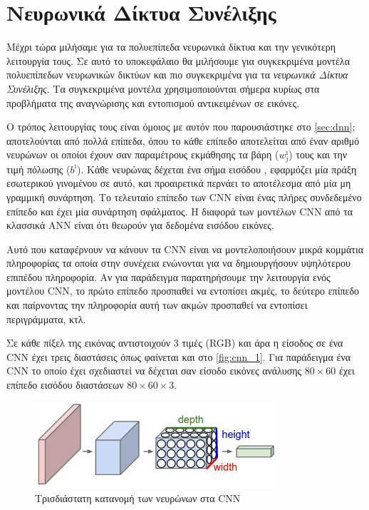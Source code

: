 \section{Νευρωνικά Δίκτυα Συνέλιξης}
\label{sec:theory_cnn}

Μέχρι τώρα μιλήσαμε για τα πολυεπίπεδα νευρωνικά δίκτυα και την γενικότερη
λειτουργία τους. Σε αυτό το υποκεφάλαιο θα μιλήσουμε για συγκεκριμένα μοντέλα
πολυεπίπεδων νευρωνικών δικτύων και πιο συγκεκριμένα για τα
\emph{νευρωνικά Δίκτυα Συνέλιξης}. Τα συγκεκριμένα μοντέλα χρησιμοποιούνται
σήμερα κυρίως στα προβλήματα της αναγνώρισης και εντοπισμού αντικειμένων
σε εικόνες.

Ο τρόπος λειτουργίας τους είναι όμοιος με αυτόν που παρουσιάστηκε στο
\autoref{sec:dnn}; αποτελούνται από πολλά επίπεδα, όπου το κάθε επίπεδο αποτελείται
από έναν αριθμό νευρώνων οι οποίοι έχουν σαν παραμέτρους εκμάθησης τα βάρη ($w_{\jmath}^{\imath}$) τους
και την τιμή πόλωσης ($b^{\imath}$).
Κάθε νευρώνας δέχεται ένα σήμα εισόδου , εφαρμόζει μία πράξη εσωτερικού γινομένου σε αυτό,
και προαιρετικά περνάει το αποτέλεσμα από μία μη γραμμική συνάρτηση.
Το τελευταίο επίπεδο των CNN είναι ένας πλήρες συνδεδεμένο επίπεδο και έχει μία
συνάρτηση σφάλματος.
Η διαφορά των μοντέλων CNN από τα κλασσικά ANN είναι ότι θεωρούν για δεδομένα εισόδου
εικόνες.

Αυτό που καταφέρνουν να κάνουν τα CNN είναι να μοντελοποιήσουν μικρά
κομμάτια πληροφορίας τα οποία στην συνέχεια ενώνονται για να δημιουργήσουν
υψηλότερου επιπέδου πληροφορία. Αν για παράδειγμα παρατηρήσουμε την λειτουργία
ενός μοντέλου CNN, το πρώτο επίπεδο προσπαθεί να εντοπίσει ακμές, το δεύτερο
επίπεδο και παίρνοντας την πληροφορία αυτή των ακμών προσπαθεί να εντοπίσει περιγράμματα,
κτλ.


Σε κάθε πίξελ της εικόνας αντιστοιχούν 3 τιμές (RGB) και άρα η είσοδος σε ένα
CNN έχει τρεις διαστάσεις όπως φαίνεται και στο \autoref{fig:cnn_1}.
Για παράδειγμα ένα CNN το οποίο έχει σχεδιαστεί να δέχεται σαν είσοδο εικόνες ανάλυσης $80\times60$
έχει επίπεδο εισόδου διαστάσεων $80\times60\times3$.

\begin{figure}[!ht]
  \centering
  \includegraphics[width=0.8\textwidth]{./images/chapter3/cnn.jpg}
  \caption[Τρισδιάστατη κατανομή των νευρώνων στα CNN]{Τρισδιάστατη κατανομή των νευρώνων στα CNN}
  \label{fig:cnn_1}
\end{figure}

